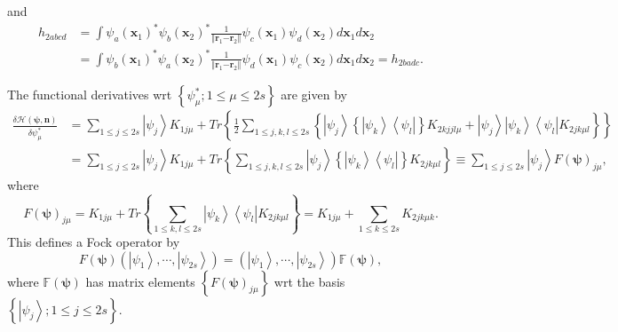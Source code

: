\documentclass[aps,preprint]{revtex4}%
\begin{document}
and
\begin{align}
h_{2abcd}  &  =\int\psi_{a}\left(  \mathbf{x}_{1}\right)  ^{\ast}\psi
_{b}\left(  \mathbf{x}_{2}\right)  ^{\ast}\frac{1}{\left\Vert \mathbf{r}%
_{1}\mathbf{-r}_{2}\right\Vert }\psi_{c}\left(  \mathbf{x}_{1}\right)
\psi_{d}\left(  \mathbf{x}_{2}\right)  d\mathbf{x}_{1}d\mathbf{x}%
_{2}\nonumber\\
&  =\int\psi_{b}\left(  \mathbf{x}_{1}\right)  ^{\ast}\psi_{a}\left(
\mathbf{x}_{2}\right)  ^{\ast}\frac{1}{\left\Vert \mathbf{r}_{1}%
\mathbf{-r}_{2}\right\Vert }\psi_{d}\left(  \mathbf{x}_{1}\right)  \psi
_{c}\left(  \mathbf{x}_{2}\right)  d\mathbf{x}_{1}d\mathbf{x}_{2}=h_{2badc}.
\end{align}


The functional derivatives wrt $\left\{  \psi_{\mu}^{\ast};1\leq\mu
\leq2s\right\}  $ are given by%
\begin{align}
\frac{\delta\mathcal{H}\left(  \mathbf{\psi,n}\right)  }{\delta\psi_{\mu
}^{\ast}}  &  =\sum_{1\leq j\leq2s}\left\vert \psi_{j}\right\rangle K_{1j\mu
}+Tr\left\{  \frac{1}{2}\sum_{1\leq j,k,l\leq2s}\left\{  \left\vert \psi
_{j}\right\rangle \left\{  \left\vert \psi_{k}\right\rangle \left\langle
\psi_{l}\right\vert \right\}  K_{2kjjl\mu}+\left\vert \psi_{j}\right\rangle
\left\vert \psi_{k}\right\rangle \left\langle \psi_{l}\right\vert K_{2jk\mu
l}\right\}  \right\} \nonumber\\
&  =\sum_{1\leq j\leq2s}\left\vert \psi_{j}\right\rangle K_{1j\mu}+Tr\left\{
\sum_{1\leq j,k,l\leq2s}\left\vert \psi_{j}\right\rangle \left\{  \left\vert
\psi_{k}\right\rangle \left\langle \psi_{l}\right\vert \right\}  K_{2jk\mu
l}\right\}  \equiv\sum_{1\leq j\leq2s}\left\vert \psi_{j}\right\rangle
F\left(  \mathbf{\psi}\right)  _{j\mu},
\end{align}
where
\begin{equation}
F\left(  \mathbf{\psi}\right)  _{j\mu}=K_{1j\mu}+Tr\left\{  \sum_{1\leq
k,l\leq2s}\left\vert \psi_{k}\right\rangle \left\langle \psi_{l}\right\vert
K_{2jk\mu l}\right\}  =K_{1j\mu}+\sum_{1\leq k\leq2s}K_{2jk\mu k}.
\end{equation}
This defines a Fock operator by
\begin{equation}
F\left(  \mathbf{\psi}\right)  \left(  \left\vert \psi_{1}\right\rangle
,\cdots,\left\vert \psi_{2s}\right\rangle \right)  =\left(  \left\vert
\psi_{1}\right\rangle ,\cdots,\left\vert \psi_{2s}\right\rangle \right)
\mathbb{F}\left(  \mathbf{\psi}\right)  ,
\end{equation}
where $\mathbb{F}\left(  \mathbf{\psi}\right)  $ has matrix elements $\left\{
F\left(  \mathbf{\psi}\right)  _{j\mu}\right\}  $ wrt the basis $\left\{
\left\vert \psi_{j}\right\rangle ;1\leq j\leq2s\right\}  .$
\end{document}
